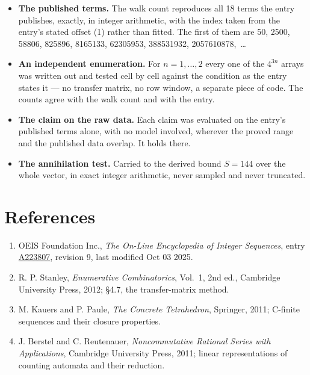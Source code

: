 \documentclass[11pt]{article}
\theoremstyle{definition}
\begin{document}
\begin{itemize}

\item {\bfseries The published terms.} The walk count reproduces all 18 terms the entry publishes, exactly, in integer arithmetic, with the index taken from the entry's stated offset (1) rather than fitted. The first of them are 50, 2500, 58806, 825896, 8165133, 62305953, 388531932, 2057610878,~\dots

\item {\bfseries An independent enumeration.} For $n = 1,\dots,2$ every one of the $4^{3n}$ arrays was written out and tested cell by cell against the condition as the entry states it --- no transfer matrix, no row window, a separate piece of code. The counts agree with the walk count and with the entry.

\item {\bfseries The claim on the raw data.} Each claim was evaluated on the entry's published terms alone, with no model involved, wherever the proved range and the published data overlap. It holds there.

\item {\bfseries The annihilation test.} Carried to the derived bound $S = 144$ over the whole vector, in exact integer arithmetic, never sampled and never truncated.

\end{itemize}

\section{References}

\begin{enumerate}

\item OEIS Foundation Inc., \emph{The On-Line Encyclopedia of Integer Sequences}, entry \href{https://oeis.org/A223807}{A223807}, revision 9, last modified Oct 03 2025.

\item R. P. Stanley, \emph{Enumerative Combinatorics}, Vol.~1, 2nd ed., Cambridge University Press, 2012; \S4.7, the transfer-matrix method.

\item M. Kauers and P. Paule, \emph{The Concrete Tetrahedron}, Springer, 2011; C-finite sequences and their closure properties.

\item J. Berstel and C. Reutenauer, \emph{Noncommutative Rational Series with Applications}, Cambridge University Press, 2011; linear representations of counting automata and their reduction.

\end{enumerate}
\end{document}
